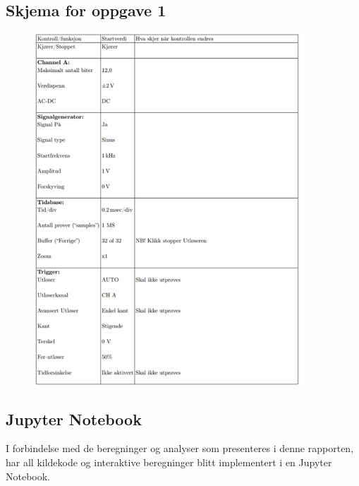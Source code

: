 \documentclass[norsk,a4paper,12pt]{article}
\begin{document}
\newpage
\begin{appendices}
\section{Skjema for oppgave 1}
\begin{figure}[htbp]
    \centering
    \includegraphics[width=0.9\textwidth]{Figs/FYS2150_lab1.png}
    \label{fig:appendiksA}
\end{figure}
\end{appendices}


\begin{appendices}
\section{Jupyter Notebook}
I forbindelse med de beregninger og analyser som presenteres i denne rapporten, har all kildekode og interaktive beregninger blitt implementert i en Jupyter Notebook. 
\end{appendices}
\end{document}
